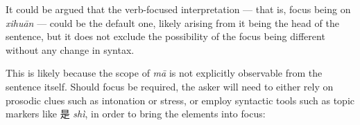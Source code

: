 \documentclass[12pt, UTF8]{article}
\begin{document}

\begin{exe}
\end{exe}


It could be argued that the verb-focused interpretation --- that is, focus being on \textit{xihu\={a}n} --- could be the default one, likely arising from it being the head of the sentence, but it does not exclude the possibility of the focus being different without any change in syntax.

This is likely because the scope of \textit{m\={a}} is not explicitly observable from the sentence itself. Should focus be required, the asker will need to either rely on prosodic clues such as intonation or stress, or employ syntactic tools such as topic markers like 是 \textit{sh\`{i}}, in order to bring the elements into focus:
\end{document}
